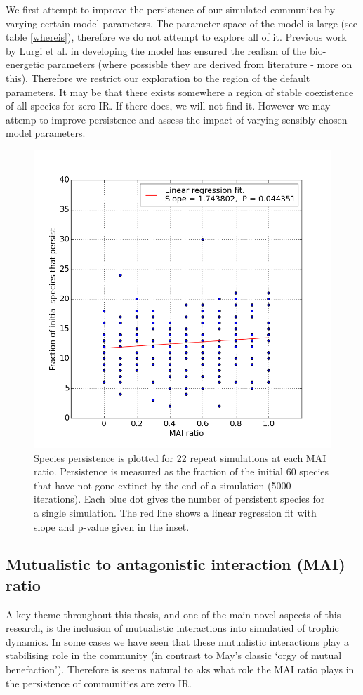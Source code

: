 We first attempt to improve the persistence of our simulated communites by varying certain model parameters. The parameter space of the model is large (see table \ref{whereis}), therefore we do not attempt to explore all of it. Previous work by Lurgi et al. \cite{lurgi2015effects} in developing the model has ensured the realism of the bio-energetic parameters (where possisble they are derived from literature - more on this). Therefore we restrict our exploration to the region of the default parameters. It may be that there exists somewhere a region of stable coexistence of all species for zero IR. If there does, we will not find it. However we may attemp to improve persistence and assess the impact of varying sensibly chosen model parameters.

\begin{figure}[h!]
	\centering
	\includegraphics[width=0.5\linewidth]{"figures/mvp1_22reps"}
	\caption{Species persistence is plotted for 22 repeat simulations at each MAI ratio. Persistence is measured as the fraction of the initial 60 species that have not gone extinct by the end of a simulation (5000 iterations). Each blue dot gives the number of persistent species for a single simulation. The red line shows a linear regression fit with slope and p-value given in the inset.}
	\label{fig:mai_vs_persistence}
\end{figure}


\subsection{Mutualistic to antagonistic interaction (MAI) ratio}
\label{sec:mvp}

A key theme throughout this thesis, and one of the main novel aspects of this research, is the inclusion of mutualistic interactions into simulatied of trophic dynamics. In some cases we have seen that these mutualistic interactions play a stabilising role in the community (in contrast to May's classic `orgy of mutual benefaction'). Therefore is seems natural to aks what role the MAI ratio plays in the persistence of communities are zero IR.

